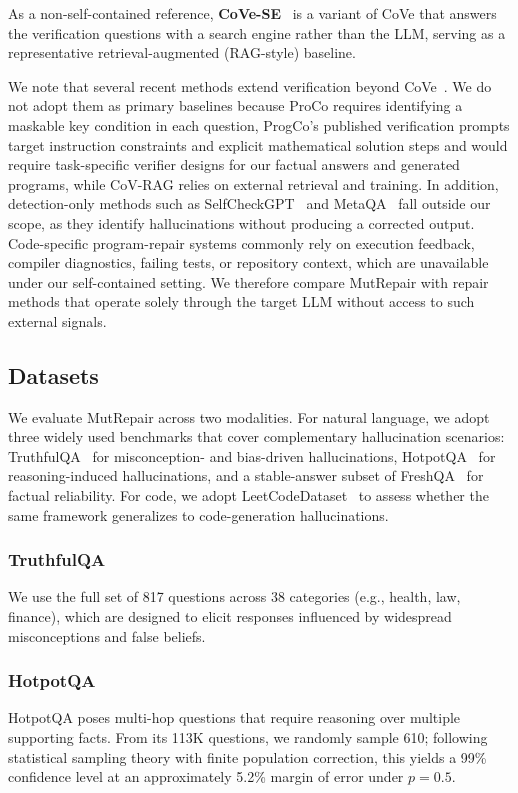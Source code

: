 \documentclass[acmsmall,screen,review,anonymous]{acmart}
\begin{document}
As a non-self-contained reference, \textbf{CoVe-SE}~\cite{dhuliawala2024chain} is a variant of CoVe that answers the verification questions with a search engine rather than the LLM, serving as a representative retrieval-augmented (RAG-style) baseline.

We note that several recent methods extend verification beyond CoVe~\cite{wu2024large, song2025progco, he2024retrieving}. We do not adopt them as primary baselines because ProCo requires identifying a maskable key condition in each question, ProgCo's published verification prompts target instruction constraints and explicit mathematical solution steps and would require task-specific verifier designs for our factual answers and generated programs, while CoV-RAG relies on external retrieval and training. In addition, detection-only methods such as SelfCheckGPT~\cite{manakul2023selfcheckgpt} and MetaQA~\cite{yang2025hallucination} fall outside our scope, as they identify hallucinations without producing a corrected output. Code-specific program-repair systems commonly rely on execution feedback, compiler diagnostics, failing tests, or repository context, which are unavailable under our self-contained setting. We therefore compare MutRepair with repair methods that operate solely through the target LLM without access to such external signals.


\subsection{Datasets}
We evaluate MutRepair across two modalities. For natural language, we adopt three widely used benchmarks that cover complementary hallucination scenarios: TruthfulQA~\cite{lin2022truthfulqa} for misconception- and bias-driven hallucinations, HotpotQA~\cite{yang2018hotpotqa} for reasoning-induced hallucinations, and a stable-answer subset of FreshQA~\cite{vu2023freshllms} for factual reliability. For code, we adopt LeetCodeDataset~\cite{xia2025leetcodedataset} to assess whether the same framework generalizes to code-generation hallucinations.

\subsubsection{TruthfulQA}
We use the full set of 817 questions across 38 categories (e.g., health, law, finance), which are designed to elicit responses influenced by widespread misconceptions and false beliefs.

\subsubsection{HotpotQA}
HotpotQA poses multi-hop questions that require reasoning over multiple supporting facts. From its 113K questions, we randomly sample 610; following statistical sampling theory with finite population correction, this yields a 99\% confidence level at an approximately 5.2\% margin of error under $p=0.5$.
\end{document}
